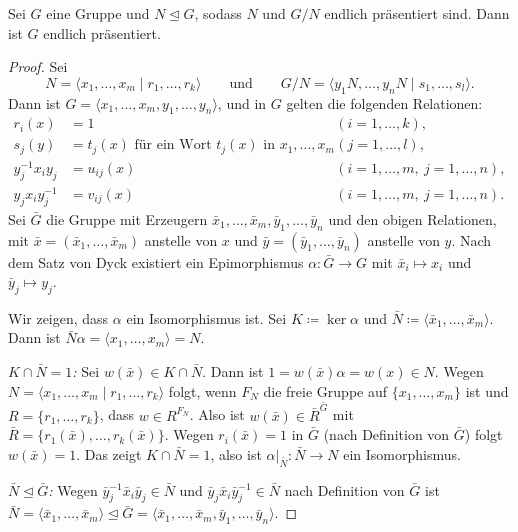 \documentclass[11pt]{article}
\begin{document}
\begin{theorem}[P.~Hall]\Theorem
  Sei $G$ eine Gruppe und $N \trianglelefteq G$, sodass $N$ und $G/N$ endlich präsentiert sind. Dann ist $G$ endlich präsentiert.
\end{theorem}

\begin{proof}
  Sei
  \[ N = \langle x_1, \dots, x_m \mid r_1, \dots, r_k \rangle \qquad \text{und} \qquad G/N = \langle y_1 N, \dots, y_n N \mid s_1, \dots, s_l \rangle. \]
  Dann ist $G = \langle x_1, \dots, x_m, y_1, \dots, y_n \rangle$, und in $G$ gelten die folgenden Relationen:
  \begin{align*}
    r_i(x) &= 1 && (i = 1, \dots, k), \\
    s_j(y) &= t_j(x) \text{ für ein Wort } t_j(x) \text{ in } x_1, \dots, x_m && (j = 1, \dots, l), \\
    y_j^{-1} x_i y_j &= u_{ij}(x) && (i = 1, \dots, m,\ j = 1, \dots, n), \\
    y_j x_i y_j^{-1} &= v_{ij}(x) && (i = 1, \dots, m,\ j = 1, \dots, n).
  \end{align*}
Sei $\bar{G}$ die Gruppe mit Erzeugern $\bar{x}_1, \dots, \bar{x}_m, \bar{y}_1, \dots, \bar{y}_n$ und den obigen Relationen, mit $\bar{x} = (\bar{x}_1, \dots, \bar{x}_m)$ anstelle von $x$ und $\bar{y} = (\bar{y}_1, \dots, \bar{y}_n)$ anstelle von $y$. Nach dem Satz von Dyck existiert ein Epimorphismus $\alpha\colon \bar{G} \to G$ mit $\bar{x}_i \mapsto x_i$ und $\bar{y}_j \mapsto y_j$.

  Wir zeigen, dass $\alpha$ ein Isomorphismus ist. Sei $K \coloneqq \ker\alpha$ und $\bar{N} \coloneqq \langle \bar{x}_1, \dots, \bar{x}_m \rangle$. Dann ist $\bar{N}\alpha = \langle x_1, \dots, x_m \rangle = N$.

  \textit{$K \cap \bar{N} = 1$:} Sei $w(\bar{x}) \in K \cap \bar{N}$. Dann ist $1 = w(\bar{x})\alpha = w(x) \in N$. Wegen $N = \langle x_1, \dots, x_m \mid r_1, \dots, r_k \rangle$ folgt, wenn $F_N$ die freie Gruppe auf $\{x_1, \dots, x_m\}$ ist und $R = \{r_1, \dots, r_k\}$, dass $w \in R^{F_N}$. Also ist $w(\bar{x}) \in \bar{R}^{\bar{G}}$ mit $\bar{R} = \{r_1(\bar{x}), \dots, r_k(\bar{x})\}$. Wegen $r_i(\bar{x}) = 1$ in $\bar{G}$ (nach Definition von $\bar{G}$) folgt $w(\bar{x}) = 1$. Das zeigt $K \cap \bar{N} = 1$, also ist $\alpha|_{\bar{N}}\colon \bar{N} \to N$ ein Isomorphismus.


  \textit{$\bar{N} \trianglelefteq \bar{G}$:} Wegen $\bar{y}_j^{-1} \bar{x}_i \bar{y}_j \in \bar{N}$ und $\bar{y}_j \bar{x}_i \bar{y}_j^{-1} \in \bar{N}$ nach Definition von $\bar{G}$ ist $\bar{N} = \langle \bar{x}_1, \dots, \bar{x}_m \rangle \trianglelefteq \bar{G} = \langle \bar{x}_1, \dots, \bar{x}_m, \bar{y}_1, \dots, \bar{y}_n \rangle$.


\end{proof}
\end{document}
